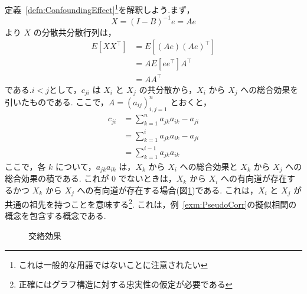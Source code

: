 \documentclass[uplatex, dvipdfmx]{jsarticle}
\begin{document}
定義~\ref{defn:ConfoundingEffect}\footnote{これは一般的な用語ではないことに注意されたい}を解釈しよう.まず，
\begin{equation}
  X = (I-B)^{-1}e = Ae
\end{equation}
より $X$ の分散共分散行列は，
\begin{align}
  E[XX^\top] &= E[(Ae)(Ae)^\top] \\
  &= A E[ee^\top] A^\top \\
  &= AA^\top
\end{align}
である.$i<j$として，$c_{ji}$ は $X_i$ と $X_j$ の共分散から，$X_i$ から $X_j$ への総合効果を引いたものである.
ここで，$A = (a_{ij})_{i,j=1}^n$ とおくと，
\begin{align}
  c_{ji} &= \sum_{k=1}^n a_{jk} a_{ik} - a_{ji} \\
  &= \sum_{k=1}^i a_{jk} a_{ik} - a_{ji} \\
  &= \sum_{k=1}^{i-1} a_{jk} a_{ik}
\end{align}
ここで，各 $k$ について，$a_{jk} a_{ik}$ は，$X_k$ から $X_i$ への総合効果と $X_k$ から $X_j$ への総合効果の積である.
これが $0$ でないときは，$X_k$ から $X_i$ への有向道が存在するかつ $X_k$ から $X_j$ への有向道が存在する場合(図\ref{fig:Confounding})である.
これは，$X_i$ と $X_j$ が共通の祖先を持つことを意味する\footnote{正確にはグラフ構造に対する忠実性の仮定が必要である}.
これは，例~\ref{exm:PseudoCorr}の擬似相関の概念を包含する概念である.

\begin{figure}[htbp]
  \centering
  \caption{交絡効果}
  \label{fig:Confounding}
\end{figure}
\end{document}
